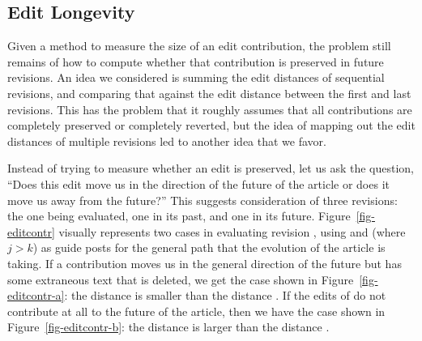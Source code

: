 \subsection{Edit Longevity}

Given a method to measure the size of an edit contribution,
the problem still remains of how to compute whether that
contribution is preserved in future revisions.
An idea we considered is summing the edit distances of
sequential revisions, and comparing that against the edit
distance between the first and last revisions.
This has the problem that it roughly assumes that all
contributions are completely preserved or completely
reverted, but the idea of mapping out the edit distances of
multiple revisions led to another idea that we favor.

Instead of trying to measure whether an edit is preserved,
let us ask the question, ``Does this edit move us in the
direction of the future of the article or does it move us away
from the future?''
This suggests consideration of three revisions: the one being
evaluated, one in its past, and one in its future.
Figure~\ref{fig-editcontr} visually represents two cases in
evaluating revision , using 
and  (where $j > k$) as guide posts for the general
path that the evolution of the article is taking.
If a contribution moves us in the general direction of
the future but has some extraneous text that is deleted,
we get the case shown in Figure~\ref{fig-editcontr-a}:
the distance  is smaller than the distance .
If the edits of  do not contribute at all to the
future of the article, then we have the case shown in
Figure~\ref{fig-editcontr-b}:
the distance  is larger than the distance .

